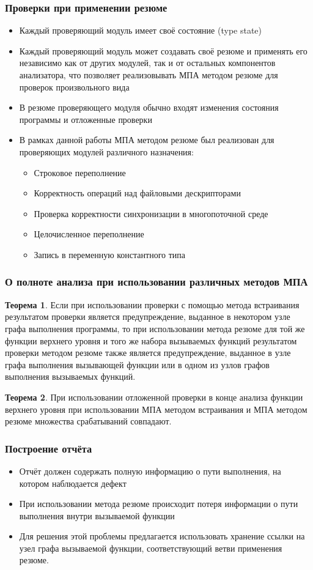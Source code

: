 \documentclass[14pt]{beamer}
\begin{document}
\begin{frame}[allowframebreaks]
\frametitle{Проверки при применении резюме}
\begin{itemize}
  \item Каждый проверяющий модуль имеет своё состояние (type state)
  \item Каждый проверяющий модуль может создавать своё резюме и применять его независимо как от других модулей, так и от остальных компонентов анализатора, что позволяет реализовывать МПА методом резюме для проверок произвольного вида
  \item В резюме проверяющего модуля обычно входят изменения состояния программы и отложенные проверки
  \item В рамках данной работы МПА методом резюме был реализован для проверяющих модулей различного назначения:
    \begin{itemize}
    \item Строковое переполнение
    \item Корректность операций над файловыми дескрипторами
    \item Проверка корректности синхронизации в многопоточной среде
    \item Целочисленное переполнение
    \item Запись в переменную константного типа
  \end{itemize}
\end{itemize}
\end{frame}

\begin{frame}[allowframebreaks]
\frametitle{О полноте анализа при использовании различных методов МПА}
\textbf{Теорема 1}. Если при использовании проверки с помощью метода встраивания результатом проверки является предупреждение, выданное в некотором узле графа выполнения программы, то при использовании метода резюме для той же функции верхнего уровня и того же набора вызываемых функций результатом проверки методом резюме также является предупреждение, выданное в узле графа выполнения вызывающей функции или в одном из узлов графов выполнения вызываемых функций.

\textbf{Теорема 2}. При использовании отложенной проверки в конце анализа функции верхнего уровня при использовании МПА методом встраивания и МПА методом резюме множества срабатываний совпадают.
\end{frame}

\begin{frame}
\frametitle{Построение отчёта}
\begin{itemize}
  \item Отчёт должен содержать полную информацию о пути выполнения, на котором наблюдается дефект
  \item При использовании метода резюме происходит потеря информации о пути выполнения внутри вызываемой функции
  \item Для решения этой проблемы предлагается использовать хранение ссылки на узел графа вызываемой функции, соответствующий ветви применения резюме.
\end{itemize}
\end{frame}
\end{document}
